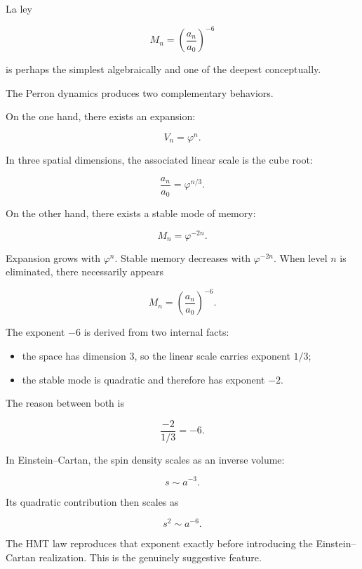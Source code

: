 La ley\par

\[
M_n
=
\left(\frac{a_n}{a_0}\right)^{-6}
\]

is perhaps the simplest algebraically and one of the deepest conceptually.\par

The Perron dynamics produces two complementary behaviors.\par

On the one hand, there exists an expansion:\par

\[
V_n=\varphi^n.
\]

In three spatial dimensions, the associated linear scale is the cube root:\par

\[
\frac{a_n}{a_0}
=
\varphi^{n/3}.
\]

On the other hand, there exists a stable mode of memory:\par

\[
M_n=\varphi^{-2n}.
\]

Expansion grows with \(\varphi^n\). Stable memory decreases with \(\varphi^{-2n}\). When level \(n\) is eliminated, there necessarily appears\par

\[
M_n
=
\left(\frac{a_n}{a_0}\right)^{-6}.
\]

The exponent \(-6\) is derived from two internal facts:\par

\begin{itemize}[leftmargin=*,itemsep=0.35em]
\item the space has dimension \(3\), so the linear scale carries exponent \(1/3\);
\item the stable mode is quadratic and therefore has exponent \(-2\).
\end{itemize}

The reason between both is\par

\[
\frac{-2}{1/3}=-6.
\]

In Einstein–Cartan, the spin density scales as an inverse volume:\par

\[
s\sim a^{-3}.
\]

Its quadratic contribution then scales as\par

\[
s^2\sim a^{-6}.
\]

The HMT law reproduces that exponent exactly before introducing the Einstein–Cartan realization. This is the genuinely suggestive feature.\par

